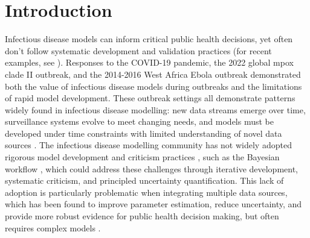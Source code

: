 \documentclass{article}
\begin{document}
\tableofcontents
\newpage

\section{Introduction}

Infectious disease models can inform critical public health decisions, yet often don't follow systematic development and validation practices (for recent examples, see \citep{Ward2024-sp, Fyles2024-qz, Abbott2021-delta, Abbott2022-prevalence}).
Responses to the COVID-19 pandemic, the 2022 global mpox clade II outbreak, and the 2014-2016 West Africa Ebola outbreak \citep[e.g.][]{knock2021key, ro2025estimating, Abbott2021-delta, Abbott2022-prevalence, Ward2024-sp, birrell2025real} demonstrated both the value of infectious disease models during outbreaks and the limitations of rapid model development.
These outbreak settings all demonstrate patterns widely found in infectious disease modelling: new data streams emerge over time, surveillance systems evolve to meet changing needs, and models must be developed under time constraints with limited understanding of novel data sources \citep{mccaw2023role}.
The infectious disease modelling community has not widely adopted rigorous model development and criticism practices \citep{box1979robustness}, such as the Bayesian workflow \citep{green2003highly,gelman2020bayesian, nicholson2022interoperability}, which could address these challenges through iterative development, systematic criticism, and principled uncertainty quantification.
This lack of adoption is particularly problematic when integrating multiple data sources, which has been found to improve parameter estimation, reduce uncertainty, and provide more robust evidence for public health decision making, but often requires complex models \citep{deangelis2018analysing, sherratt2021exploring}.
\end{document}
